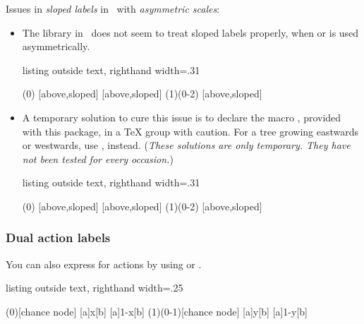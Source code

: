 \warning
Issues in \emph{sloped labels} in \TikZ\ with \emph{asymmetric scales}:
\begin{itemize}\tightlist
\item The  library in \TikZ\ does not seem to treat sloped labels properly, when  or  is used asymmetrically.

\begin{tcblisting}{listing outside text, righthand width=.31\linewidth}
\begin{istgame}[xscale=2.5]
\istroot(0)
  [above,sloped]
  [above,sloped]      \endist
\istroot(1)(0-2)
  \istb{\text{\fbox{$\alpha$}}}[above,sloped]  
  \istb{\text{\fbox{$\beta$}}}  \endist
\end{istgame}
\end{tcblisting}

\item A temporary solution to cure this issue is to declare the macro \cmd{\xtcureslopedlabelsNS}, provided with this package, in a TeX group with caution. 
For a tree growing eastwards or westwards, use \cmd{\xtcureslopelabelsEW}, instead.
(\emph{These solutions are only temporary. They have not been tested for every occasion.})

\begin{tcblisting}{listing outside text, righthand width=.31\linewidth}
\begin{istgame}[xscale=2.5]
\xtcureslopedlabelsNS
\istroot(0)
  [above,sloped]
  [above,sloped]      \endist
\istroot(1)(0-2)
  \istb{\text{\fbox{$\alpha$}}}[above,sloped]  
  \istb{\text{\fbox{$\beta$}}}  \endist
\end{istgame}
\end{tcblisting}
\end{itemize}


\subsubsection{Dual action labels}

You can also express  for actions by using \icmd{\istB} or \icmd{\istBt}.

\begin{tcblisting}{listing outside text, righthand width=.25\linewidth}
\begin{istgame}[sloped,font=\footnotesize]
\xtdistance{15mm}{25mm}
\istroot(0)[chance node]
  [a]{x}[b]  
  [a]{1-x}[b]    \endist
\istroot(1)(0-1)[chance node]
  [a]{y}[b]
  [a]{1-y}[b]  \endist
\end{istgame}
\end{tcblisting}

